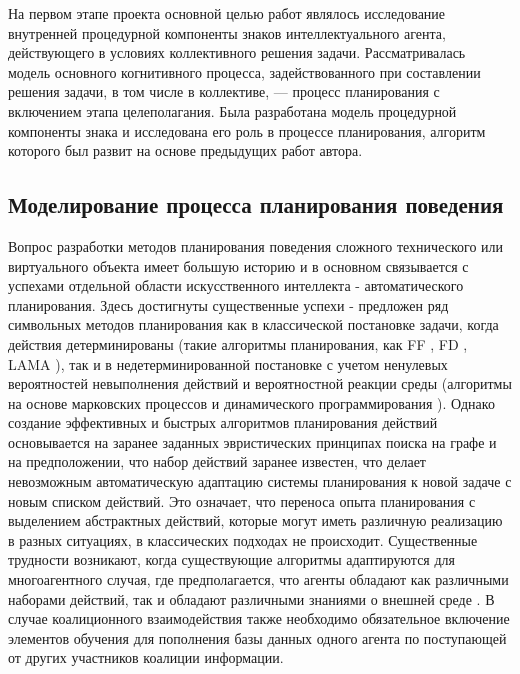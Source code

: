 \documentclass[12pt]{report}
\begin{document}
	На первом этапе проекта основной целью работ являлось исследование внутренней процедурной компоненты знаков интеллектуального агента, действующего в условиях коллективного решения задачи. Рассматривалась модель основного когнитивного процесса, задействованного при составлении решения задачи, в том числе в коллективе, --- процесс планирования с включением этапа целеполагания. Была разработана модель процедурной компоненты знака и исследована его роль в процессе планирования, алгоритм которого был развит на основе предыдущих работ автора.
	
	\subsection{Моделирование процесса планирования поведения}
	
	Вопрос разработки методов планирования поведения сложного технического или виртуального объекта имеет большую историю и в основном связывается с успехами отдельной области искусственного интеллекта - автоматического планирования. Здесь достигнуты существенные успехи - предложен ряд символьных методов планирования как в классической постановке задачи, когда действия детерминированы (такие алгоритмы планирования, как FF \cite{Hoffmann2001}, FD \cite{Helmert2006}, LAMA \cite{Richter2010}), так и в недетерминированной постановке с учетом ненулевых вероятностей невыполнения действий и вероятностной реакции среды (алгоритмы на основе марковских процессов и динамического программирования \cite{Barto1995,Bonet2009}). Однако создание эффективных и быстрых алгоритмов планирования действий основывается на заранее заданных эвристических принципах поиска на графе и на предположении, что набор действий заранее известен, что делает невозможным автоматическую адаптацию системы планирования к новой задаче с новым списком действий. Это означает, что переноса опыта планирования с выделением абстрактных действий, которые могут иметь различную реализацию в разных ситуациях, в классических подходах не происходит. Существенные трудности возникают, когда существующие алгоритмы адаптируются для многоагентного случая, где предполагается, что агенты обладают как различными наборами действий, так и обладают различными знаниями о внешней среде \cite{Brafman2015}. В случае коалиционного взаимодействия также необходимо обязательное включение элементов обучения для пополнения базы данных одного агента по поступающей от других участников коалиции информации.
	
\end{document}

